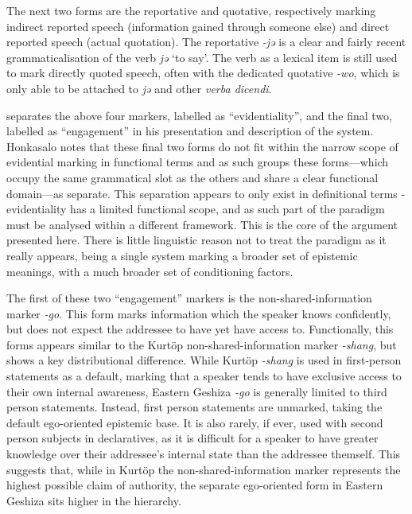 The next two forms are the reportative and quotative, respectively marking indirect reported speech (information gained through someone else) and direct reported speech (actual quotation). The reportative \textit{-jə} is a clear and fairly recent grammaticalisation of the verb \textit{jə} `to say'. The verb as a lexical item is still used to mark directly quoted speech, often with the dedicated quotative \textit{-wo}, which is only able to be attached to \textit{jə} and other \textit{verba dicendi}.

 separates the above four markers, labelled as ``evidentiality'', and the final two, labelled as ``engagement'' in his presentation and description of the system. Honkasalo notes that these final two forms do not fit within the narrow scope of evidential marking in functional terms and as such groups these forms---which occupy the same grammatical slot as the others and share a clear functional domain---as separate. This separation appears to only exist in definitional terms - evidentiality has a limited functional scope, and as such part of the paradigm must be analysed within a different framework. This is the core of the argument presented here. There is little linguistic reason not to treat the paradigm as it really appears, being a single system marking a broader set of epistemic meanings, with a much broader set of conditioning factors.

The first of these two ``engagement'' markers is the non-shared-information marker \textit{-go}. This form marks information which the speaker knows confidently, but does not expect the addressee to have yet have access to. Functionally, this forms appears similar to the Kurtöp non-shared-information marker \textit{-shang}, but shows a key distributional difference. While Kurtöp \textit{-shang} is used in first-person statements as a default, marking that a speaker tends to have exclusive access to their own internal awareness, Eastern Geshiza \textit{-go} is generally limited to third person statements. Instead, first person statements are unmarked, taking the default ego-oriented epistemic base. It is also rarely, if ever, used with second person subjects in declaratives, as it is difficult for a speaker to have greater knowledge over their addressee's internal state than the addressee themself. This suggests that, while in Kurtöp the non-shared-information marker represents the highest possible claim of authority, the separate ego-oriented form in Eastern Geshiza sits higher in the hierarchy.

